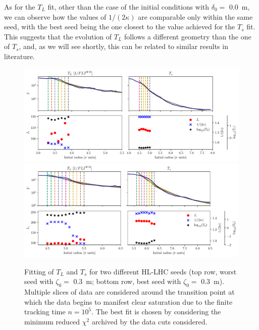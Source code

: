 As for the $T_L$ fit, other than the case of the initial conditions with $\delta_0 =$ \SI{0.0}{\metre}, we can observe how the values of $1/(2\kappa)$ are comparable only within the same seed, with the best seed being the one closest to the value achieved for the $T_s$ fit. This suggests that the evolution of $T_L$ follows a different geometry than the one of $T_s$, and, as we will see shortly, this can be related to similar results in literature. 

\begin{figure}
    \centering
    \includegraphics[width=1\textwidth]{6_lhc_dynamic_indicators/figs/fit_l_time_bad.pdf}
    \includegraphics[width=1\textwidth]{6_lhc_dynamic_indicators/figs/fit_l_time_best.pdf}
    \caption{Fitting of $T_L$ and $T_s$ for two different HL-LHC seeds (top row, worst seed with $\zeta_0=$ \SI{0.3}{\meter}; bottom row, best seed with $\zeta_0=$ \SI{0.3}{\meter}). Multiple slices of data are considered around the transition point at which the data begins to manifest clear saturation due to the finite tracking time $n=10^5$. The best fit is chosen by considering the minimum reduced $\chi^2$ archived by the data cuts considered.}
    \label{fig:the_lyap_fit}
\end{figure}

